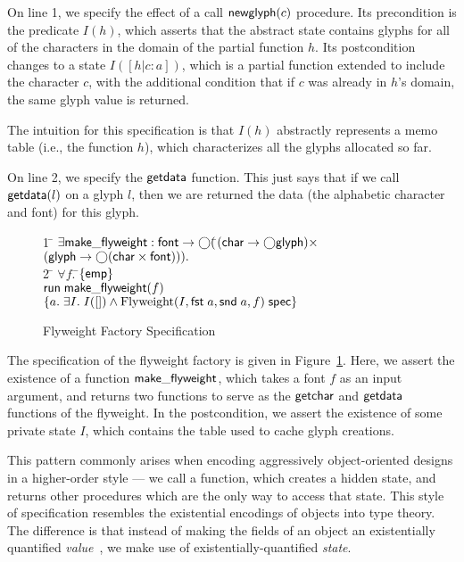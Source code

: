 On line 1, we specify the effect of a call $\mathsf{newglyph}(c)$
procedure. Its precondition is the predicate $I(h)$, which asserts
that the abstract state contains glyphs for all of the characters in
the domain of the partial function $h$. Its postcondition changes to a
state $I([h|c:a])$, which is a partial function extended to include
the character $c$, with the additional condition that if $c$ was
already in $h$'s domain, the same glyph value is returned. 

The intuition for this specification is that $I(h)$ abstractly represents
a memo table (i.e., the function $h$), which characterizes all the 
glyphs allocated so far. 

On line 2, we specify the $\mathsf{getdata}$ function. This just says
that if we call $\mathsf{getdata}(l)$ on a glyph $l$, then we are
returned the data (the alphabetic character and font) for this glyph.

\begin{figure}
\begin{tabbing}
1 \qquad \= $\exists \mathsf{make\_flyweight} :
\mathsf{font} \to \bigcirc($\=$(\mathsf{char} \to \bigcirc{\mathsf{glyph}}) \times$ \\
\> \> $(\mathsf{glyph} \to \bigcirc{(\mathsf{char}\times \mathsf{font})})).$\\
2 \> \;\;\= $\forall f.\;$\=$\{{\mathsf{emp}}\}$ \\
  \>\> \> $\mathsf{run}\;{\mathsf{make\_flyweight}(f)}$ \\
  \>\> \> $\{{a.\; \exists I.\; I([]) \land {\mbox{Flyweight}(I, \mathsf{fst}\; a, \mathsf{snd}\; a, f)}\;\mathsf{spec}}\}$ 
\end{tabbing}
\caption{Flyweight Factory Specification}
\label{flyweight-factory-spec}
\end{figure}


The specification of the flyweight factory is given in
Figure~\ref{flyweight-factory-spec}.  Here, we assert the existence of
a function $\mathsf{make\_flyweight}$, which takes a font $f$ as an
input argument, and returns two functions to serve as the
$\mathsf{getchar}$ and $\mathsf{getdata}$ functions of the flyweight. In
the postcondition, we assert the existence of some private state $I$,
which contains the table used to cache glyph creations.

This pattern commonly arises when encoding aggressively
object-oriented designs in a higher-order style --- we call a
function, which creates a hidden state, and returns other procedures
which are the only way to access that state. This style of
specification resembles the existential encodings of objects into type
theory. The difference is that instead of making the fields of an
object an existentially quantified \emph{value}~\cite{pierce-turner}, we
make use of existentially-quantified \emph{state}.

